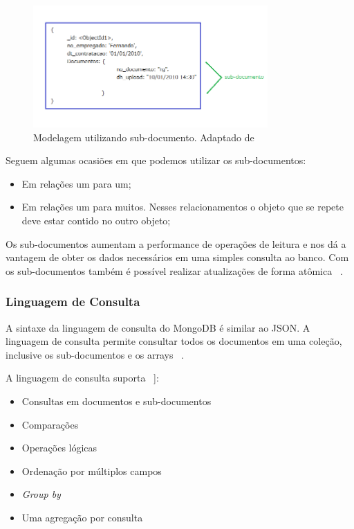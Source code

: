 	\begin{figure}[!htbp]
		\begin{center}
			\includegraphics[width=0.8\textwidth]{subdocumento}
		\end{center}
		\caption{ Modelagem utilizando sub-documento. Adaptado de ~\cite{sitemongodb}}
		\label{fig:subdocumento}
	\end{figure}

Seguem algumas ocasiões em que podemos utilizar os sub-documentos:

\begin{itemize}
	\item Em relações um para um;
	\item Em relações um para muitos. Nesses relacionamentos o objeto que se repete deve estar contido no outro objeto;
\end{itemize}

Os sub-documentos aumentam a performance de operações de leitura e nos dá a vantagem de obter os dados necessários em uma simples consulta ao banco. Com os sub-documentos também é possível realizar atualizações de forma atômica ~\cite{Orendanalysisand}.

\subsubsection{Linguagem de Consulta}

A sintaxe da linguagem de consulta do MongoDB é similar ao JSON. A linguagem de consulta permite consultar todos os documentos em uma coleção, inclusive os sub-documentos e os arrays ~\cite{Orendanalysisand}.

A linguagem de consulta suporta ~\cite{Orendanalysisand}]:
\begin{itemize}
	\item Consultas em documentos e sub-documentos
	\item Comparações
	\item Operações lógicas
	\item Ordenação por múltiplos campos
	\item \textit{Group by}
	\item Uma agregação por consulta
\end{itemize}

